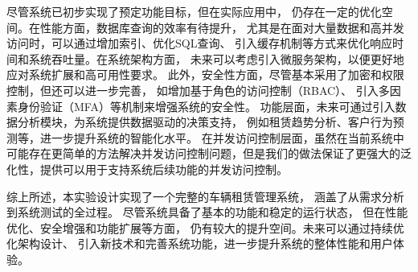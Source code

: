 \documentclass[UTF8,a4paper,12pt]{ctexart}
\begin{document}
尽管系统已初步实现了预定功能目标，但在实际应用中，
仍存在一定的优化空间。在性能方面，数据库查询的效率有待提升，
尤其是在面对大量数据和高并发访问时，可以通过增加索引、优化SQL查询、
引入缓存机制等方式来优化响应时间和系统吞吐量。在系统架构方面，
未来可以考虑引入微服务架构，以便更好地应对系统扩展和高可用性要求。
此外，安全性方面，尽管基本采用了加密和权限控制，但还可以进一步完善，
如增加基于角色的访问控制（RBAC）、
引入多因素身份验证（MFA）等机制来增强系统的安全性。
功能层面，未来可通过引入数据分析模块，为系统提供数据驱动的决策支持，
例如租赁趋势分析、客户行为预测等，进一步提升系统的智能化水平。
在并发访问控制层面，虽然在当前系统中可能存在更简单的方法解决并发访问控制问题，但是我们的做法保证了更强大的泛化性，提供可以用于支持系统后续功能的并发访问控制。

综上所述，本实验设计实现了一个完整的车辆租赁管理系统，
涵盖了从需求分析到系统测试的全过程。
尽管系统具备了基本的功能和稳定的运行状态，
但在性能优化、安全增强和功能扩展等方面，
仍有较大的提升空间。未来可以通过持续优化架构设计、
引入新技术和完善系统功能，进一步提升系统的整体性能和用户体验。




\end{document}
